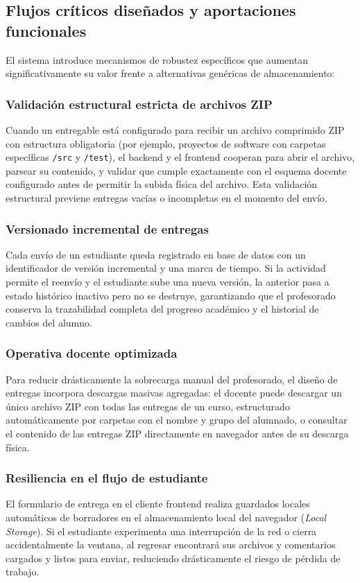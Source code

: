 \subsection{Flujos cr\'iticos dise\~nados y aportaciones funcionales}

El sistema introduce mecanismos de robustez espec\'ificos que aumentan significativamente su valor frente a alternativas gen\'ericas de almacenamiento:

\subsubsection*{Validaci\'on estructural estricta de archivos ZIP}
Cuando un entregable est\'a configurado para recibir un archivo comprimido ZIP con estructura obligatoria (por ejemplo, proyectos de software con carpetas espec\'ificas \texttt{/src} y \texttt{/test}), el backend y el frontend cooperan para abrir el archivo, parsear su contenido, y validar que cumple exactamente con el esquema docente configurado antes de permitir la subida f\'isica del archivo. Esta validaci\'on estructural previene entregas vac\'ias o incompletas en el momento del env\'io.

\subsubsection*{Versionado incremental de entregas}
Cada env\'io de un estudiante queda registrado en base de datos con un identificador de versi\'on incremental y una marca de tiempo. Si la actividad permite el reenv\'io y el estudiante sube una nueva versi\'on, la anterior pasa a estado hist\'orico inactivo pero no se destruye, garantizando que el profesorado conserva la trazabilidad completa del progreso acad\'emico y el historial de cambios del alumno.

\subsubsection*{Operativa docente optimizada}
Para reducir dr\'asticamente la sobrecarga manual del profesorado, el dise\~no de entregas incorpora descargas masivas agregadas: el docente puede descargar un \'unico archivo ZIP con todas las entregas de un curso, estructurado autom\'aticamente por carpetas con el nombre y grupo del alumnado, o consultar el contenido de las entregas ZIP directamente en navegador antes de su descarga f\'isica.

\subsubsection*{Resiliencia en el flujo de estudiante}
El formulario de entrega en el cliente frontend realiza guardados locales autom\'aticos de borradores en el almacenamiento local del navegador (\emph{Local Storage}). Si el estudiante experimenta una interrupci\'on de la red o cierra accidentalmente la ventana, al regresar encontrar\'a sus archivos y comentarios cargados y listos para enviar, reduciendo dr\'asticamente el riesgo de p\'erdida de trabajo.

